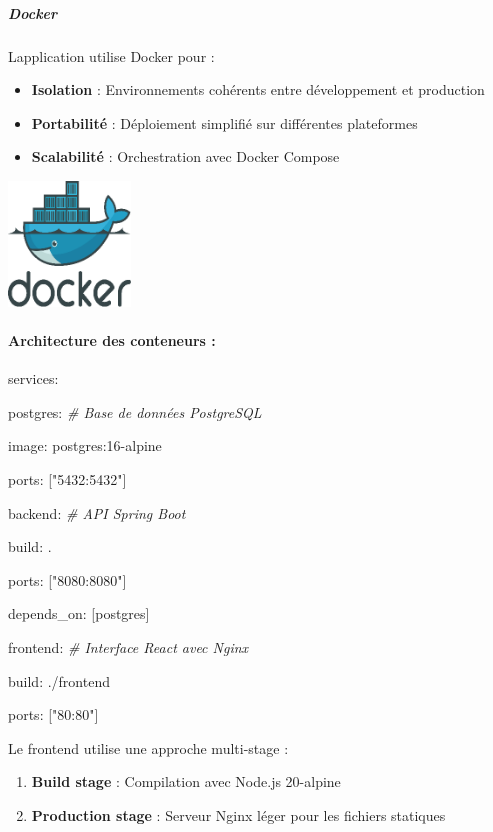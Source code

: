 \documentclass[12pt,a4paper,twoside]{report}
\begin{document}
\hypertarget{docker}{%
\subparagraph{Docker}\label{docker}}

L\textquotesingle application utilise Docker pour :

\begin{itemize}
\item
  \textbf{Isolation} : Environnements cohérents entre développement et
  production
\item
  \textbf{Portabilité} : Déploiement simplifié sur différentes
  plateformes
\item
  \textbf{Scalabilité} : Orchestration avec Docker Compose
\end{itemize}

\includegraphics[width=1.28125in,height=1.31126in]{latex_media/media/image38.png}

\hypertarget{architecture-des-conteneurs}{%
\paragraph{Architecture des conteneurs
:}\label{architecture-des-conteneurs}}

services:

postgres: \emph{\# Base de données PostgreSQL}

image: postgres:16-alpine

ports: {[}"5432:5432"{]}

backend: \emph{\# API Spring Boot}

build: .

ports: {[}"8080:8080"{]}

depends\_on: {[}postgres{]}

frontend: \emph{\# Interface React avec Nginx}

build: ./frontend

ports: {[}"80:80"{]}

Le frontend utilise une approche multi-stage :

\begin{enumerate}
\def\labelenumi{\arabic{enumi}.}
\item
  \textbf{Build stage} : Compilation avec Node.js 20-alpine
\item
  \textbf{Production stage} : Serveur Nginx léger pour les fichiers
  statiques
\end{enumerate}
\end{document}
